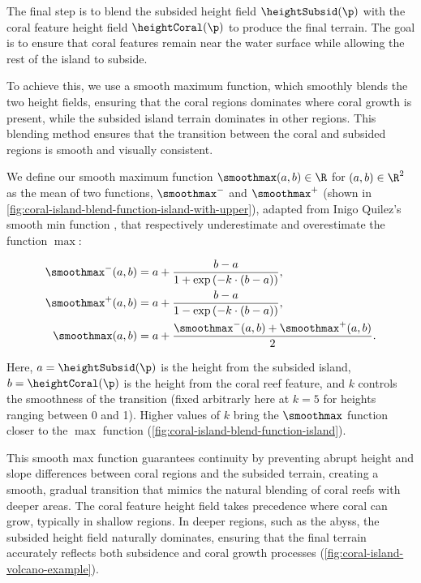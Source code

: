 The final step is to blend the subsided height field $\heightSubsid(\p)$ with the coral feature height field $\heightCoral(\p)$ to produce the final terrain. The goal is to ensure that coral features remain near the water surface while allowing the rest of the island to subside.

To achieve this, we use a smooth maximum function, which smoothly blends the two height fields, ensuring that the coral regions dominates where coral growth is present, while the subsided island terrain dominates in other regions. This blending method ensures that the transition between the coral and subsided regions is smooth and visually consistent.

We define our smooth maximum function $\smoothmax(a, b) \in \R$ for $(a, b) \in \R^2$ as the mean of two functions, $\smoothmax^-$ and $\smoothmax^+$ (shown in \cref{fig:coral-island-blend-function-island-with-upper}), adapted from Inigo Quilez's smooth min function \cite{Quilez2013}, that respectively underestimate and overestimate the function $\max$:

\begin{align*}
    \smoothmax^-(a, b) &= a + \frac{b - a}{1 + \exp\left(-k \cdot (b - a) \right)}, \\
    \smoothmax^+(a, b) &= a + \frac{b - a}{1 - \exp\left(-k \cdot (b - a) \right)}, \\
    \smoothmax(a, b) &= a + \frac{\smoothmax^-(a, b) + \smoothmax^+(a, b)}{2}.
\end{align*}

Here, $a = \heightSubsid(\p)$ is the height from the subsided island, $b = \heightCoral(\p)$ is the height from the coral reef feature, and $k$ controls the smoothness of the transition (fixed arbitrarly here at $k=5$ for heights ranging between 0 and 1). Higher values of $k$ bring the $\smoothmax$ function closer to the $\max$ function (\cref{fig:coral-island-blend-function-island}).

This smooth max function guarantees continuity by preventing abrupt height and slope differences between coral regions and the subsided terrain, creating a smooth, gradual transition that mimics the natural blending of coral reefs with deeper areas. The coral feature height field takes precedence where coral can grow, typically in shallow regions. In deeper regions, such as the abyss, the subsided height field naturally dominates, ensuring that the final terrain accurately reflects both subsidence and coral growth processes (\cref{fig:coral-island-volcano-example}).

